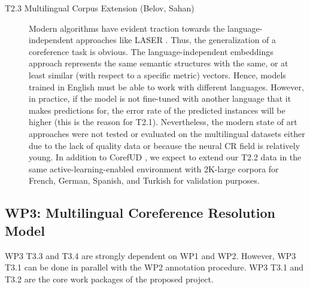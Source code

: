 \begin{description}
	\item [T2.3 Multilingual Corpus Extension (Belov, Sahan)] Modern algorithms have evident traction towards the language-independent approaches like LASER \cite{artetxe2019massively}. 
	Thus, the generalization of a coreference task is obvious. The language-independent embeddings approach represents the same semantic structures with the same, or at least similar (with respect to a specific metric) vectors. 
	Hence, models trained in English must be able to work with different languages. 
	However, in practice, if the model is not fine-tuned with another language that it makes predictions for, the error rate of the predicted instances will be higher (this is the reason for T2.1). 
	Nevertheless, the modern state of art approaches were not tested or evaluated on the multilingual datasets either due to the lack of quality data or because the neural CR field is relatively young. 
	In addition to CorefUD \cite{cr-mult-Nedoluzhko2021}, we expect to extend our T2.2 data in the same active-learning-enabled environment with 2K-large corpora for French, German, Spanish, and Turkish for validation purposes.

\end{description}


\subsection*{WP3: Multilingual Coreference Resolution Model}

WP3 T3.3 and T3.4  are strongly dependent on WP1 and WP2. However, WP3 T3.1 can be done in parallel with the WP2 annotation procedure. WP3 T3.1 and T3.2 are the core work packages of the proposed project.

